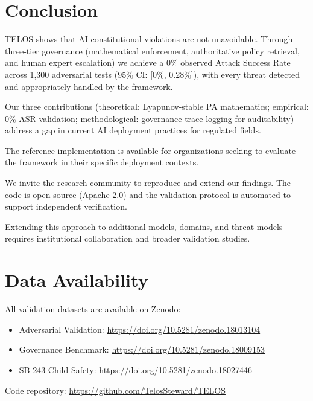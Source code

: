 \documentclass[11pt,a4paper]{article}
\begin{document}
\section{Conclusion}

TELOS shows that AI constitutional violations are not unavoidable. Through three-tier governance (mathematical enforcement, authoritative policy retrieval, and human expert escalation) we achieve a 0\% observed Attack Success Rate across 1,300 adversarial tests (95\% CI: [0\%, 0.28\%]), with every threat detected and appropriately handled by the framework.

Our three contributions (theoretical: Lyapunov-stable PA mathematics; empirical: 0\% ASR validation; methodological: governance trace logging for auditability) address a gap in current AI deployment practices for regulated fields.

The reference implementation is available for organizations seeking to evaluate the framework in their specific deployment contexts.

We invite the research community to reproduce and extend our findings. The code is open source (Apache 2.0) and the validation protocol is automated to support independent verification.

Extending this approach to additional models, domains, and threat models requires institutional collaboration and broader validation studies.

\section*{Data Availability}

All validation datasets are available on Zenodo:
\begin{itemize}
\item Adversarial Validation: \url{https://doi.org/10.5281/zenodo.18013104}
\item Governance Benchmark: \url{https://doi.org/10.5281/zenodo.18009153}
\item SB 243 Child Safety: \url{https://doi.org/10.5281/zenodo.18027446}
\end{itemize}

Code repository: \url{https://github.com/TelosSteward/TELOS}


\end{document}
